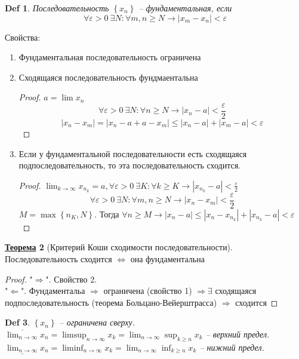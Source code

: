 \documentclass[12pt]{article}
\newenvironment{MyList}[1][4pt]{
  \begin{enumerate}[1.]
  \setlength{\parskip}{0pt}
  \setlength{\itemsep}{#1}
}{       
  \end{enumerate}
}
\def\SO{\Rightarrow}     %
\def\EQ{\Leftrightarrow} %
\theoremstyle{definition} %
\newtheorem{Thm}{\underline{Теорема}}[subsection] %
\theoremstyle{plain} %
\newtheorem{Def}[Thm]{Def} %
\theoremstyle{remark} %
\begin{document}
\begin{Def}
    Последовательность $\left\{x_n\right\}$ -- фундаментальная, если 
    \[\forall \varepsilon > 0 \ \exists N : \forall m, n \geqslant N \to |x_m - x_n| < \varepsilon\]
\end{Def}

Свойства:
\begin{MyList}
    \item Фундаментальная последовательность ограничена
    \item Сходящаяся последовательность фундмаентальна
    \begin{proof}
        $a = \lim x_n$
        \[\forall \varepsilon > 0 \ \exists N : \forall n \geqslant N \to |x_n - a| < \frac{\varepsilon}{2}\]
        \[|x_n - x_m| = |x_n - a + a - x_m| \leqslant |x_n - a| + |x_m - a| < \varepsilon\]  
    \end{proof}
    \item Если у фундаментальной последовательности есть сходящаяся подпоследовательность, то эта последовательность сходится.
    \begin{proof}
        $\lim_{k \to \infty} x_{n_k} = a, \forall \varepsilon > 0 \ \exists K : \forall k \geqslant K \to |x_{n_k} - a| < \frac{\varepsilon}{2}$ 
        \[\forall \varepsilon > 0 \ \exists N : \forall m, n \geqslant N \to |x_n - x_m| < \frac{\varepsilon}{2}\]
        $M = \max \left\{n_K, N\right\}$. Тогда $\forall n \geqslant M \to |x_n - a| \leqslant |x_n - x_{n_k}| + |x_{n_k} - a| < \varepsilon$ 
    \end{proof}
\end{MyList}

\begin{Thm}[Критерий Коши сходимости последовательности]
    Последовательность сходится $\EQ$ она фундаментальна
\end{Thm}

\begin{proof}
    "$\SO$". Свойство 2. \\
    "$\Leftarrow$". Фундаментальа $\SO$ ограничена (свойство 1) $\SO \exists$ сходящаяся подпоследовательность (теорема Больцано-Вейерштрасса) $\SO$ сходится  
\end{proof}

\begin{Def}
    $\left\{x_n\right\}$ -- ограничена сверху. \\
    $\overline{\lim_{n \to \infty}} x_n = \limsup_{n \to \infty} x_k = \lim_{n \to \infty} \sup_{k \geqslant n} x_k$  -- верхний предел. \\
    $\underline{\lim_{n \to \infty}} x_n = \liminf_{n \to \infty} x_k = \lim_{n \to \infty} \inf_{k \geqslant n} x_k$  -- нижний предел. 
\end{Def} 
\end{document}
